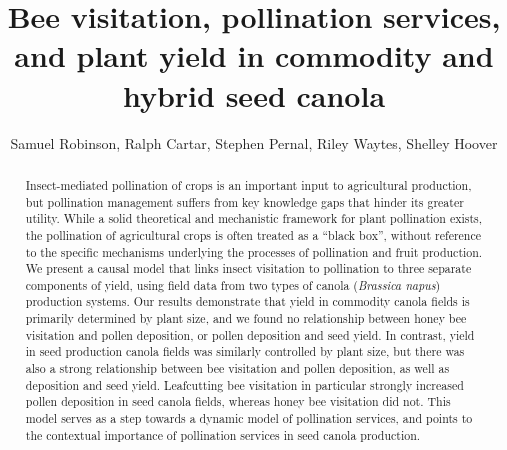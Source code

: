 \documentclass[12pt]{article} %
\title{Bee visitation, pollination services, and plant yield in commodity and hybrid seed canola}
\author{Samuel Robinson, Ralph Cartar, Stephen Pernal, Riley Waytes, Shelley Hoover}
\date{}
\begin{document}
\maketitle
\doublespacing

\begin{abstract}
Insect-mediated pollination of crops is an important input to agricultural production, but pollination management suffers from key knowledge gaps that hinder its greater utility. 
While a solid theoretical and mechanistic framework for plant pollination exists, the pollination of agricultural crops is often treated as a ``black box”, without reference to the specific mechanisms underlying the processes of pollination and fruit production. 
We present a causal model that links insect visitation to pollination to three separate components of yield, using field data from two types of canola (\emph{Brassica napus}) production systems. 
Our results demonstrate that yield in commodity canola fields is primarily determined by plant size, and we found no relationship between honey bee visitation and pollen deposition, or pollen deposition and seed yield. 
In contrast, yield in seed production canola fields was similarly controlled by plant size, but there was also a strong relationship between bee visitation and pollen deposition, as well as deposition and seed yield. 
Leafcutting bee visitation in particular strongly increased pollen deposition in seed canola fields, whereas honey bee visitation did not. 
This model serves as a step towards a dynamic model of pollination services, and points to the contextual importance of pollination services in seed canola production.
\end{abstract}

    
\end{document}
